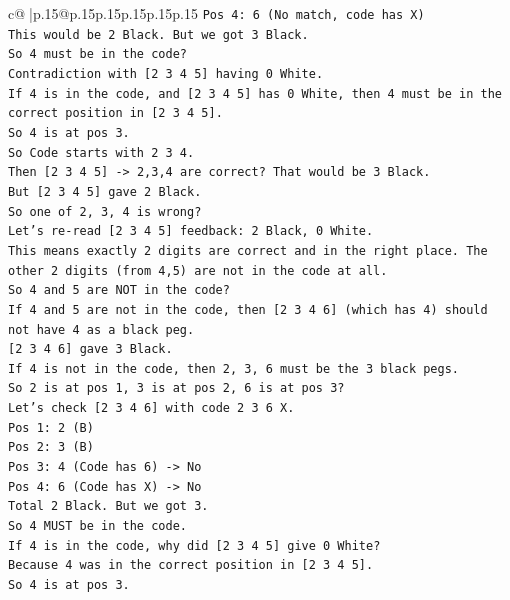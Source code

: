 \documentclass{article}
\begin{document}
{\begin{supertabular}{c@{$\;$}|p{.15\linewidth}@{}p{.15\linewidth}p{.15\linewidth}p{.15\linewidth}p{.15\linewidth}p{.15\linewidth}}
{{{\texttt{Pos 4: 6 (No match, code has X)} \\
\texttt{This would be 2 Black. But we got 3 Black.} \\
\texttt{So 4 must be in the code?} \\
\texttt{Contradiction with {[}2 3 4 5{]} having 0 White.} \\
\texttt{If 4 is in the code, and {[}2 3 4 5{]} has 0 White, then 4 must be in the correct position in {[}2 3 4 5{]}.} \\
\texttt{So 4 is at pos 3.} \\
\texttt{So Code starts with 2 3 4.} \\
\texttt{Then {[}2 3 4 5{]} {-}> 2,3,4 are correct? That would be 3 Black.} \\
\texttt{But {[}2 3 4 5{]} gave 2 Black.} \\
\texttt{So one of 2, 3, 4 is wrong?} \\
\texttt{Let's re{-}read {[}2 3 4 5{]} feedback: 2 Black, 0 White.} \\
\texttt{This means exactly 2 digits are correct and in the right place. The other 2 digits (from 4,5) are not in the code at all.} \\
\texttt{So 4 and 5 are NOT in the code?} \\
\texttt{If 4 and 5 are not in the code, then {[}2 3 4 6{]} (which has 4) should not have 4 as a black peg.} \\
\texttt{{[}2 3 4 6{]} gave 3 Black.} \\
\texttt{If 4 is not in the code, then 2, 3, 6 must be the 3 black pegs.} \\
\texttt{So 2 is at pos 1, 3 is at pos 2, 6 is at pos 3?} \\
\texttt{Let's check {[}2 3 4 6{]} with code 2 3 6 X.} \\
\texttt{Pos 1: 2 (B)} \\
\texttt{Pos 2: 3 (B)} \\
\texttt{Pos 3: 4 (Code has 6) {-}> No} \\
\texttt{Pos 4: 6 (Code has X) {-}> No} \\
\texttt{Total 2 Black. But we got 3.} \\
\texttt{So 4 MUST be in the code.} \\
\texttt{If 4 is in the code, why did {[}2 3 4 5{]} give 0 White?} \\
\texttt{Because 4 was in the correct position in {[}2 3 4 5{]}.} \\
\texttt{So 4 is at pos 3.} \\
}}}
\end{supertabular}}
\end{document}

